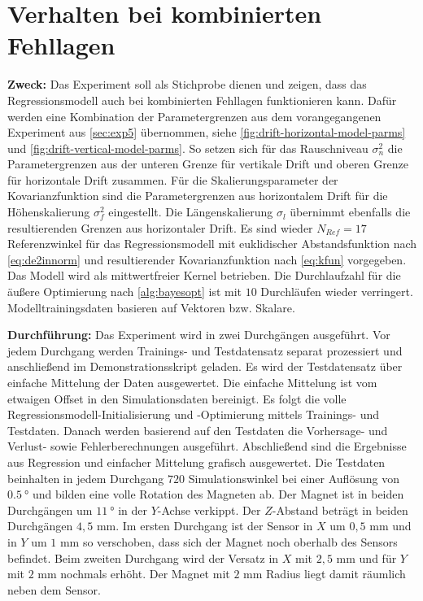 %

\section{Verhalten bei kombinierten Fehllagen}\label{sec:exp6}

\textbf{Zweck:} Das Experiment soll als Stichprobe dienen und zeigen, dass das Regressionsmodell auch bei kombinierten Fehllagen funktionieren kann. Dafür werden eine Kombination der Parametergrenzen aus dem vorangegangenen Experiment aus \autoref{sec:exp5} übernommen, siehe \autoref{fig:drift-horizontal-model-parms} und \autoref{fig:drift-vertical-model-parms}. So setzen sich für das Rauschniveau $\sigma_n^2$ die Parametergrenzen aus der unteren Grenze für vertikale Drift und oberen Grenze für horizontale Drift zusammen. Für die Skalierungsparameter der Kovarianzfunktion sind die Parametergrenzen aus horizontalem Drift für die Höhenskalierung $\sigma_f^2$ eingestellt. Die Längenskalierung $\sigma_l$ übernimmt ebenfalls die resultierenden Grenzen aus horizontaler Drift. Es sind wieder $N_{Ref} = 17$  Referenzwinkel für das Regressionsmodell mit euklidischer Abstandsfunktion nach \autoref{eq:de2innorm} und resultierender Kovarianzfunktion nach \autoref{eq:kfun} vorgegeben. Das Modell wird als mittwertfreier Kernel betrieben. Die Durchlaufzahl für die äußere Optimierung nach \autoref{alg:bayesopt} ist mit $10$ Durchläufen wieder verringert. Modelltrainingsdaten basieren auf Vektoren bzw. Skalare.

\textbf{Durchführung:} Das Experiment wird in zwei Durchgängen ausgeführt. Vor jedem Durchgang werden Trainings- und Testdatensatz separat prozessiert und anschließend im Demonstrationsskript geladen. Es wird der Testdatensatz über einfache Mittelung der Daten ausgewertet. Die einfache Mittelung ist vom etwaigen Offset in den Simulationsdaten bereinigt. Es folgt die volle Regressionsmodell-Initialisierung und -Optimierung mittels Trainings- und Testdaten. Danach werden basierend auf den Testdaten die Vorhersage- und Verlust- sowie Fehlerberechnungen ausgeführt. Abschließend sind die Ergebnisse aus Regression und einfacher Mittelung grafisch ausgewertet. Die Testdaten beinhalten in jedem Durchgang $720$ Simulationswinkel bei einer Auflösung von $\SI{0,5}{\degree}$ und bilden eine volle Rotation des Magneten ab. Der Magnet ist in beiden Durchgängen um $\SI{11}{\degree}$ in der $Y$-Achse verkippt. Der $Z$-Abstand beträgt in beiden Durchgängen $4,5$ mm. Im ersten Durchgang ist der Sensor in $X$ um $0,5$ mm und in $Y$ um $1$ mm so verschoben, dass sich der Magnet noch oberhalb des Sensors befindet. Beim zweiten Durchgang wird der Versatz in $X$ mit $2,5$ mm und für $Y$ mit $2$ mm nochmals erhöht. Der Magnet mit $2$ mm Radius liegt damit räumlich neben dem Sensor.

